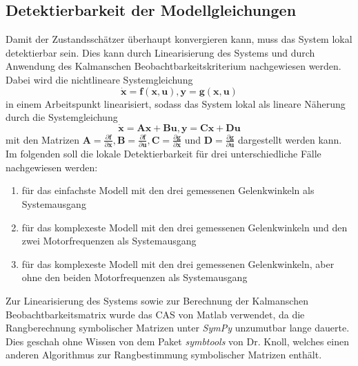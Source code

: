 \documentclass[times, 10pt,twocolumn]{article}
\begin{document}
	\subsection{Detektierbarkeit der Modellgleichungen}
	Damit der Zustandsschätzer überhaupt konvergieren kann, muss das System lokal detektierbar sein. Dies kann durch Linearisierung des Systems und durch Anwendung des Kalmanschen Beobachtbarkeitskriterium nachgewiesen werden. Dabei wird die nichtlineare Systemgleichung  $$ \bm{\dot x} = \bm{f}(\bm{x},\bm{u}), \bm y = \bm{g}(\bm{x}, \bm u) $$ in einem Arbeitspunkt linearisiert, sodass das System lokal als lineare Näherung durch die Systemgleichung $$ \bm{\dot x} = \bm{A} \bm{x} + \bm{B} \bm{u}, \bm y = \bm C \bm x + \bm D \bm u $$ mit den Matrizen $ \bm A = \frac{\partial{ \bm f}}{\partial{\bm x}}, \bm B = \frac{\partial{ \bm f}}{\partial{\bm u}} , \bm C = \frac{\partial{ \bm g}}{\partial{\bm x}}$ und $\bm D = \frac{\partial{ \bm g}}{\partial{\bm u}}$ dargestellt werden kann. Im folgenden soll die lokale Detektierbarkeit für drei unterschiedliche Fälle nachgewiesen werden:
	\begin{enumerate}
		\item für das einfachste Modell mit den drei gemessenen Gelenkwinkeln als Systemausgang
		\item für das komplexeste Modell mit den drei gemessenen Gelenkwinkeln und den zwei Motorfrequenzen als Systemausgang
		\item für das komplexeste Modell mit den drei gemessenen Gelenkwinkeln, aber ohne den beiden Motorfrequenzen als Systemausgang
	\end{enumerate}
	Zur Linearisierung des Systems sowie zur Berechnung der Kalmanschen Beobachtbarkeitsmatrix wurde das CAS von Matlab verwendet, da die Rangberechnung symbolischer Matrizen unter \textit{SymPy} unzumutbar lange dauerte. Dies geschah ohne Wissen von dem Paket \textit{symbtools} von Dr. Knoll, welches einen anderen Algorithmus zur Rangbestimmung symbolischer Matrizen enthält. 
\end{document}
